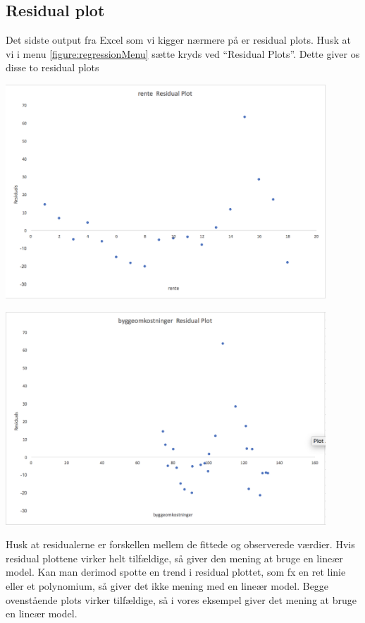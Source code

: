 \subsection{Residual plot}
Det sidste output fra Excel som vi kigger nærmere på er residual plots. Husk at vi i menu \ref{figure:regressionMenu} sætte kryds ved ``Residual Plots''. Dette giver os disse to residual plots
\begin{center}
\includegraphics[width=12cm]{regression/images/residualplot1.JPG}
\end{center}
\begin{center}
\includegraphics[width=12cm]{regression/images/residualplot2.JPG}
\end{center}
Husk at residualerne er forskellen mellem de fittede og observerede værdier. Hvis residual plottene virker helt tilfældige, så giver den mening at bruge en lineær model. Kan man derimod spotte en trend i residual plottet, som fx en ret linie eller et polynomium, så giver det ikke mening med en lineær model. Begge ovenstående plots virker tilfældige, så i vores eksempel giver det mening at bruge en lineær model.

